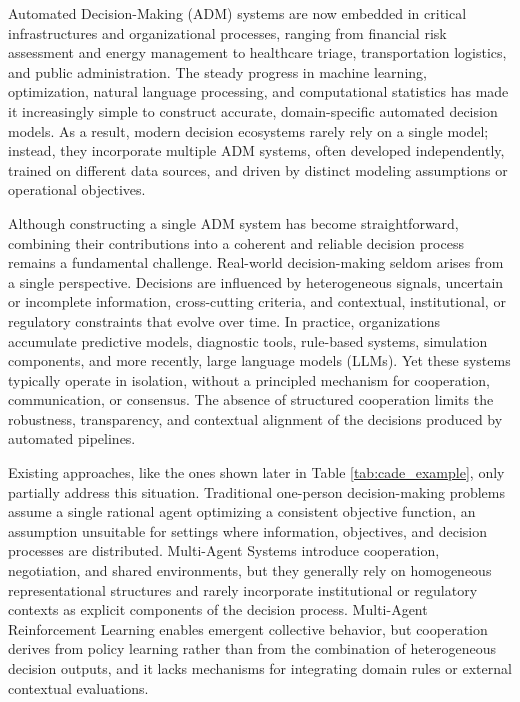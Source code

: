 \documentclass[letterpaper, 10 pt,conference]{IEEEconf}
\begin{document}
Automated Decision-Making (ADM) systems  are now embedded in critical infrastructures and organizational processes, ranging from financial risk assessment and energy management to healthcare triage, transportation logistics, and public administration. The steady progress in machine learning, optimization, natural language processing, and computational statistics has made it increasingly simple to construct accurate, domain-specific automated decision models. As a result, modern decision ecosystems rarely rely on a single model; instead, they incorporate multiple ADM systems, often developed independently, trained on different data sources, and driven by distinct modeling assumptions or operational objectives.

Although constructing a single ADM system has become straightforward, combining their contributions into a coherent and reliable decision process remains a fundamental challenge. Real-world decision-making seldom arises from a single perspective. Decisions are influenced by heterogeneous signals, uncertain or incomplete information, cross-cutting criteria, and contextual, institutional, or regulatory constraints that evolve over time. In practice, organizations accumulate predictive models, diagnostic tools, rule-based systems, simulation components, and more recently, large language models (LLMs). Yet these systems typically operate in isolation, without a principled mechanism for cooperation, communication, or consensus. The absence of structured cooperation limits the robustness, transparency, and contextual alignment of the decisions produced by automated pipelines.

Existing approaches, like the ones shown later in Table \ref{tab:cade_example}, only partially address this situation. Traditional one-person decision-making problems assume a single rational agent optimizing a consistent objective function, an assumption unsuitable for settings where information, objectives, and decision processes are distributed. Multi-Agent Systems introduce cooperation, negotiation, and shared environments, but they generally rely on homogeneous representational structures and rarely incorporate institutional or regulatory contexts as explicit components of the decision process. Multi-Agent Reinforcement Learning enables emergent collective behavior, but cooperation derives from policy learning rather than from the combination of heterogeneous decision outputs, and it lacks mechanisms for integrating domain rules or external contextual evaluations.
\end{document}
